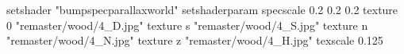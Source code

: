 setshader "bumpspecparallaxworld"
setshaderparam specscale 0.2 0.2 0.2
    texture 0 "remaster/wood/4_D.jpg"
    texture s "remaster/wood/4_S.jpg"
    texture n "remaster/wood/4_N.jpg"
    texture z "remaster/wood/4_H.jpg"
    texscale 0.125